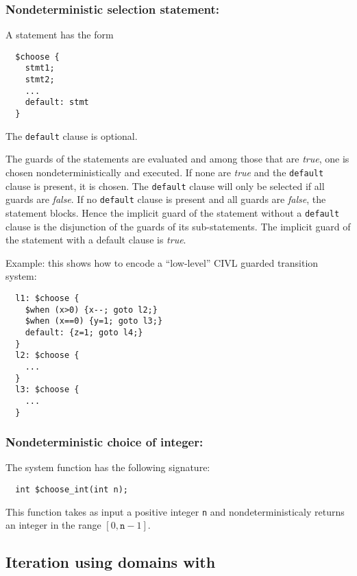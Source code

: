 \subsubsection{Nondeterministic selection statement: \cchoose}

A \cchoose{} statement has the form
\begin{verbatim}
  $choose {
    stmt1;
    stmt2;
    ...
    default: stmt
  }
\end{verbatim}
The \texttt{default} clause is optional.

The guards of the statements are evaluated and among those that are
\emph{true}, one is chosen nondeterministically and executed.  If none
are \emph{true} and the \texttt{default} clause is present, it is
chosen.  The \texttt{default} clause will only be selected if all
guards are \emph{false}.  If no \texttt{default} clause is present and
all guards are \emph{false}, the statement blocks.  Hence the implicit
guard of the \cchoose{} statement without a \texttt{default} clause is
the disjunction of the guards of its sub-statements.  The implicit
guard of the \cchoose{} statement with a default clause is
\emph{true}.

Example: this shows how to encode a ``low-level'' CIVL guarded
transition system:

\begin{verbatim}
  l1: $choose {
    $when (x>0) {x--; goto l2;}
    $when (x==0) {y=1; goto l3;}
    default: {z=1; goto l4;}
  }
  l2: $choose {
    ...
  }
  l3: $choose {
    ...
  }
\end{verbatim}


\subsubsection{Nondeterministic choice of integer:
  \texorpdfstring{\cchooseint}{\$choose\_int}}

The system function \cchooseint{} has the following signature:
\begin{verbatim}
  int $choose_int(int n);
\end{verbatim}
This function takes as input a positive integer \texttt{n} and
nondeterministicaly returns an integer in the range
$[0,\texttt{n}-1]$.

\subsection{Iteration using domains with \cfor}
\label{sec:cfor}

